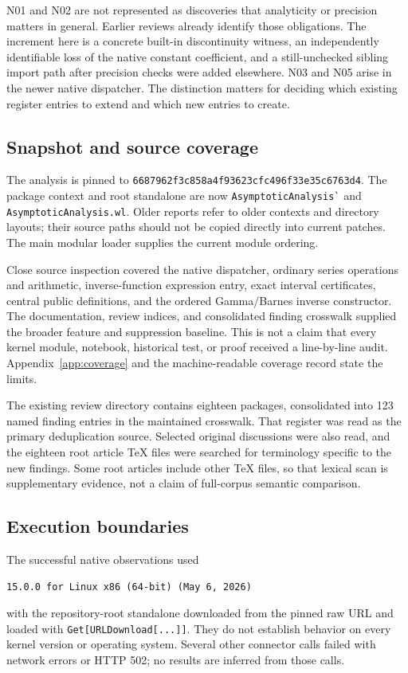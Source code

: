 \documentclass[11pt,letterpaper]{article}
\newcommand{\code}[1]{\nolinkurl{#1}}
\newcommand{\sha}{6687962f3c858a4f93623cfc496f33e35c6763d4}
\begin{document}
N01 and N02 are not represented as discoveries that analyticity or precision
matters in general. Earlier reviews already identify those obligations. The
increment here is a concrete built-in discontinuity witness, an independently
identifiable loss of the native constant coefficient, and a still-unchecked
sibling import path after precision checks were added elsewhere. N03 and N05
arise in the newer native dispatcher. The distinction matters for deciding
which existing register entries to extend and which new entries to create.

\subsection{Snapshot and source coverage}
The analysis is pinned to \texttt{\sha}. The package context and root standalone
are now \code{AsymptoticAnalysis`} and \code{AsymptoticAnalysis.wl}. Older reports
refer to older contexts and directory layouts; their source paths should not
be copied directly into current patches. The main modular loader supplies the
current module ordering.~\cite{main,readme}

Close source inspection covered the native dispatcher, ordinary series
operations and arithmetic, inverse-function expression entry, exact interval
certificates, central public definitions, and the ordered Gamma/Barnes inverse
constructor. The documentation, review indices, and consolidated finding
crosswalk supplied the broader feature and suppression baseline. This is not a
claim that every kernel module, notebook, historical test, or proof received a
line-by-line audit. Appendix~\ref{app:coverage} and the machine-readable coverage
record state the limits.

The existing review directory contains eighteen packages, consolidated into
123 named finding entries in the maintained crosswalk. That register was read
as the primary deduplication source. Selected original discussions were also
read, and the eighteen root article TeX files were searched for terminology
specific to the new findings. Some root articles include other TeX files, so
that lexical scan is supplementary evidence, not a claim of full-corpus
semantic comparison.~\cite{reviewindex,register,r4,r11}

\subsection{Execution boundaries}
The successful native observations used
\begin{lstlisting}
15.0.0 for Linux x86 (64-bit) (May 6, 2026)
\end{lstlisting}
with the repository-root standalone downloaded from the pinned raw URL and
loaded with \code{Get[URLDownload[...]]}. They do not establish behavior on every
kernel version or operating system. Several other connector calls failed with
network errors or HTTP 502; no results are inferred from those calls.
\end{document}
